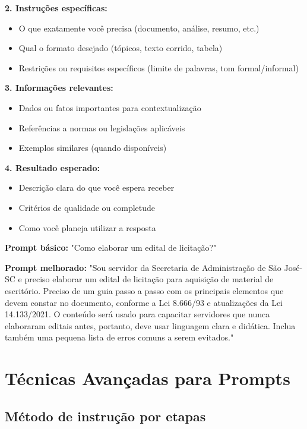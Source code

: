 \documentclass[12pt,a4paper]{book}
\begin{document}
\textbf{2. Instruções específicas:}
\begin{itemize}
    \item O que exatamente você precisa (documento, análise, resumo, etc.)
    \item Qual o formato desejado (tópicos, texto corrido, tabela)
    \item Restrições ou requisitos específicos (limite de palavras, tom formal/informal)
\end{itemize}

\textbf{3. Informações relevantes:}
\begin{itemize}
    \item Dados ou fatos importantes para contextualização
    \item Referências a normas ou legislações aplicáveis
    \item Exemplos similares (quando disponíveis)
\end{itemize}

\textbf{4. Resultado esperado:}
\begin{itemize}
    \item Descrição clara do que você espera receber
    \item Critérios de qualidade ou completude
    \item Como você planeja utilizar a resposta
\end{itemize}

\begin{tcolorbox}[exemplo]
\textbf{Prompt básico:}
"Como elaborar um edital de licitação?"

\textbf{Prompt melhorado:}
"Sou servidor da Secretaria de Administração de São José-SC e preciso elaborar um edital de licitação para aquisição de material de escritório. Preciso de um guia passo a passo com os principais elementos que devem constar no documento, conforme a Lei 8.666/93 e atualizações da Lei 14.133/2021. O conteúdo será usado para capacitar servidores que nunca elaboraram editais antes, portanto, deve usar linguagem clara e didática. Inclua também uma pequena lista de erros comuns a serem evitados."
\end{tcolorbox}

\section{Técnicas Avançadas para Prompts}

\subsection{Método de instrução por etapas}
\end{document}
